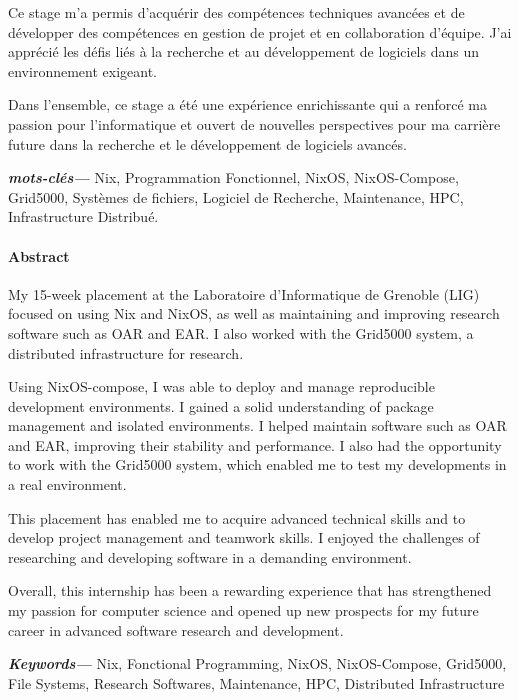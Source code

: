\documentclass[a4paper,french,12pt, titlepage]{article}
\newcommand{\paragraphnewline}[1]{\hypertarget{par#1}{\paragraph{#1}\mbox{}}}
\begin{document}
Ce stage m'a permis d'acquérir des compétences techniques avancées et de
développer des compétences en gestion de projet et en collaboration
d'équipe. J'ai apprécié les défis liés à la recherche et au
développement de logiciels dans un environnement exigeant.\newline

Dans l'ensemble, ce stage a été une expérience enrichissante qui a
renforcé ma passion pour l'informatique et ouvert de nouvelles
perspectives pour ma carrière future dans la recherche et le
développement de logiciels avancés.


\textbf{\textit{mots-clés---}} Nix, Programmation Fonctionnel, NixOS,
NixOS-Compose, Grid5000, Systèmes de fichiers, Logiciel de Recherche,
Maintenance, HPC, Infrastructure Distribué.

\begin{center}
    \item \paragraphnewline{Abstract}
\end{center}

My 15-week placement at the Laboratoire d'Informatique de Grenoble (LIG)
focused on using Nix and NixOS, as well as maintaining and improving
research software such as OAR and EAR. I also worked with the Grid5000
system, a distributed infrastructure for research.\newline

Using NixOS-compose, I was able to deploy and manage reproducible
development environments. I gained a solid understanding of package
management and isolated environments. I helped maintain software such as
OAR and EAR, improving their stability and performance. I also had the
opportunity to work with the Grid5000 system, which enabled me to test
my developments in a real environment.\newline

This placement has enabled me to acquire advanced technical skills and
to develop project management and teamwork skills. I enjoyed the
challenges of researching and developing software in a demanding
environment.\newline

Overall, this internship has been a rewarding experience that has
strengthened my passion for computer science and opened up new prospects
for my future career in advanced software research and development.

\textbf{\textit{Keywords---}} Nix, Fonctional Programming, NixOS,
NixOS-Compose, Grid5000, File Systems, Research Softwares, Maintenance,
HPC, Distributed Infrastructure
\end{document}
